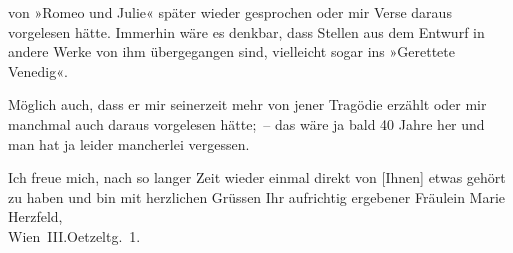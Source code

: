                von »Romeo und Julie« später wieder gesprochen
               oder mir Verse daraus vorgelesen hätte. Immerhin wäre es denkbar, dass Stellen aus
               dem Entwurf in andere Werke von ihm übergegangen sind, vielleicht sogar ins »Gerettete Venedig«.\pend
           
\pstart
           Möglich auch, dass er mir seinerzeit mehr von jener Tragödie erzählt oder mir manchmal auch daraus vorgelesen
               hätte; – das wäre ja bald 40 Jahre her und man hat ja leider mancherlei
               vergessen.\pend
           
\pstart
           Ich freue mich, nach so langer Zeit wieder einmal direkt von
                  {[}Ihnen{]} etwas gehört zu haben und bin mit herzlichen
               Grüssen\pend
           \pstart Ihr aufrichtig ergebener\pend{}{\vspace{1\baselineskip}}
\pstart
           \noindent{}Fräulein Marie Herzfeld,{\\}Wien III.Oetzeltg. 1.\pend
           \endnumbering{}  \newcommand{\dateiname}{L02598}\newcommand{\titel}{Arthur Schnitzler an Marie Herzfeld, 7. 3. 1931}\newcommand{\editorInnen}{Martin Anton Müller und Laura Untner}
